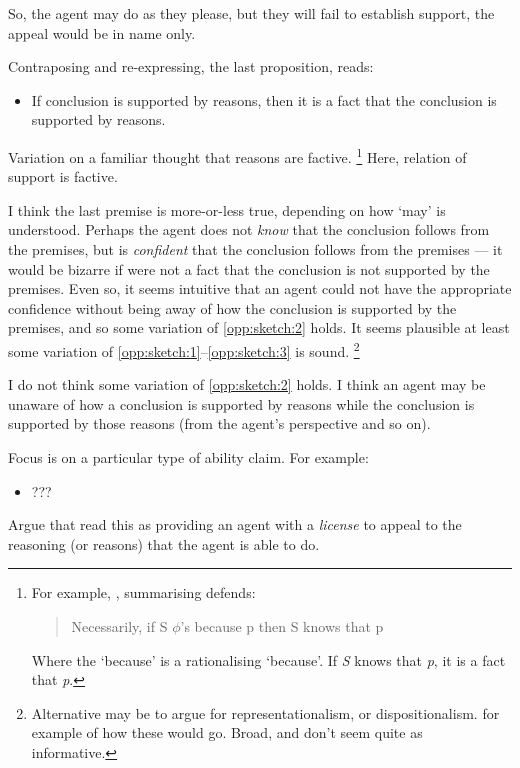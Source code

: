 \documentclass[10pt]{article}
\begin{document}
So, the agent may do as they please, but they will fail to establish support, the appeal would be in name only.

Contraposing and re-expressing, the last proposition, reads:

\begin{itemize}
\item If conclusion is supported by reasons, then it is a fact that the conclusion is supported by reasons.
\end{itemize}

Variation on a familiar thought that reasons are factive.\nolinebreak
\footnote{
  For example, \textcite[673]{Cunningham:2020aa}, summarising \textcite{Hornsby:2007aa,Hornsby:2007ab,Hornsby:2008aa} defends:
  \begin{quote}
    Necessarily, if S \(\phi\)'s because p then S knows that p
  \end{quote}
  Where the `because' is a rationalising `because'.
  If \emph{S} knows that \emph{p}, it is a fact that \emph{p}.
}
Here, relation of support is factive.

I think the last premise is more-or-less true, depending on how `may' is understood.
Perhaps the agent does not \emph{know} that the conclusion follows from the premises, but is \emph{confident} that the conclusion follows from the premises --- it would be bizarre if were not a fact that the conclusion is not supported by the premises.
Even so, it seems intuitive that an agent could not have the appropriate confidence without being away of how the conclusion is supported by the premises, and so some variation of \ref{opp:sketch:2} holds.
It seems plausible at least some variation of \ref{opp:sketch:1}--\ref{opp:sketch:3} is sound.\nolinebreak
\footnote{
  Alternative may be to argue for representationalism, or dispositionalism.
  \citeauthor{Neta:2019aa} for example of how these would go.
  Broad, and don't seem quite as informative.
}

I do not think some variation of \ref{opp:sketch:2} holds.
I think an agent may be unaware of how a conclusion is supported by reasons while the conclusion is supported by those reasons (from the agent's perspective and so on).

Focus is on a particular type of ability claim.
For example:
\begin{itemize}
\item ???
\end{itemize}

Argue that read this as providing an agent with a \emph{license} to appeal to the reasoning (or reasons) that the agent is able to do.
\end{document}
